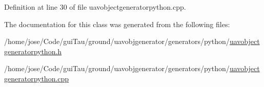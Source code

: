 Definition at line 30 of file uavobjectgeneratorpython.\-cpp.



The documentation for this class was generated from the following files\-:\begin{DoxyCompactItemize}
\item 
/home/jose/\-Code/gui\-Tau/ground/uavobjgenerator/generators/python/\hyperlink{uavobjectgeneratorpython_8h}{uavobjectgeneratorpython.\-h}\item 
/home/jose/\-Code/gui\-Tau/ground/uavobjgenerator/generators/python/\hyperlink{uavobjectgeneratorpython_8cpp}{uavobjectgeneratorpython.\-cpp}\end{DoxyCompactItemize}
